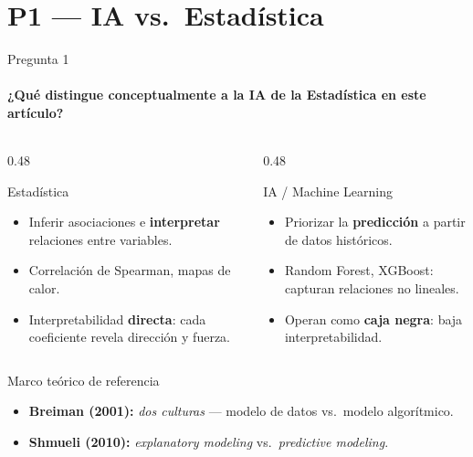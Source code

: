 \documentclass[aspectratio=169,11pt]{beamer}
\begin{document}
\section{P1 — IA vs.\ Estadística}

\begin{frame}{Pregunta 1}
  \framesubtitle{¿Qué distingue conceptualmente a la IA de la Estadística en este artículo?}
  \begin{columns}[T]
    \begin{column}{0.48\textwidth}
      \begin{block}{Estadística}
        \begin{itemize}
          \item Inferir asociaciones e \textbf{interpretar} relaciones entre variables.
          \item Correlación de Spearman, mapas de calor.
          \item Interpretabilidad \textbf{directa}: cada coeficiente revela dirección y fuerza.
        \end{itemize}
      \end{block}
    \end{column}
    \begin{column}{0.48\textwidth}
      \begin{block}{IA / Machine Learning}
        \begin{itemize}
          \item Priorizar la \textbf{predicción} a partir de datos históricos.
          \item Random Forest, XGBoost: capturan relaciones no lineales.
          \item Operan como \textbf{caja negra}: baja interpretabilidad.
        \end{itemize}
      \end{block}
    \end{column}
  \end{columns}
  \vspace{0.3em}
  \begin{alertblock}{Marco teórico de referencia}
    \begin{itemize}
      \item \textbf{Breiman (2001):} \textit{dos culturas} — modelo de datos vs.\ modelo algorítmico.
      \item \textbf{Shmueli (2010):} \textit{explanatory modeling} vs.\ \textit{predictive modeling}.
    \end{itemize}
  \end{alertblock}
\end{frame}
\end{document}
